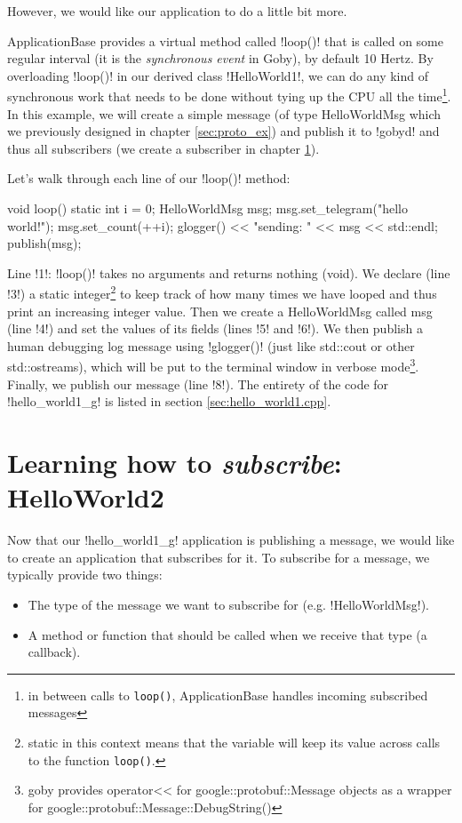 However, we would like our application to do a little bit more.

ApplicationBase provides a \gls{virtual} method called !loop()! that is called on some regular interval (it is the \textit{\gls{synchronous} event} in Goby), by default 10 Hertz. By overloading !loop()! in our derived class !HelloWorld1!, we can do any kind of synchronous work that needs to be done without tying up the CPU all the time\footnote{in between calls to \texttt{loop()}, ApplicationBase handles incoming subscribed messages}. In this example, we will create a simple message (of type HelloWorldMsg which we previously designed in chapter \ref{sec:proto_ex}) and publish it to !gobyd! and thus all subscribers (we create a subscriber in chapter \ref{sec:sub_ex}). 

Let's walk through each line of our !loop()! method:

\begin{boxedverbatim}
void loop()
{
   static int i = 0;
   HelloWorldMsg msg;
   msg.set_telegram("hello world!");
   msg.set_count(++i);
   glogger() << "sending: " << msg << std::endl;
   publish(msg);
}
\end{boxedverbatim}
\resetbvlinenumber

Line !1!: !loop()! takes no arguments and returns nothing (void). We declare (line !3!) a static integer\footnote{static in this context means that the variable will keep its value across calls to the function \texttt{loop()}.} to keep track of how many times we have looped and thus print an increasing integer value. Then we create a HelloWorldMsg called msg (line !4!) and set the values of its fields (lines !5! and !6!). We then publish a human debugging log message using !glogger()! (just like std::cout or other std::ostreams), which will be put to the terminal window in verbose mode\footnote{goby provides operator<< for google::protobuf::Message objects as a wrapper for google::protobuf::Message::DebugString()}. Finally, we publish our message (line !8!). The entirety of the code for !hello_world1_g! is listed in section \ref{sec:hello_world1.cpp}.

\section{Learning how to \textit{subscribe}: HelloWorld2} \label{sec:sub_ex}

Now that our !hello_world1_g! application is publishing a message, we would like to create an application that subscribes for it. To subscribe for a message, we typically provide two things:
\begin{itemize}
\item The type of the message we want to subscribe for (e.g. !HelloWorldMsg!).
\item A method or function that should be called when we receive that type (a callback).
\end{itemize}

